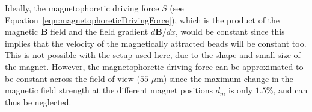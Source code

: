 Ideally, the magnetophoretic driving force $S$ (see Equation~\ref{eqn:magnetophoreticDrivingForce}), which is the product of the magnetic $\mathbf{B}$ field and the field gradient $d\mathbf{B}/dx$, would be constant since this implies that the velocity of the magnetically attracted beads will be constant too. This is not possible with the setup used here, due to the shape and small size of the magnet. However, the magnetophoretic driving force can be approximated to be constant across the field of view ($55$ $\mu$m) since the maximum change in the magnetic field strength at the different magnet positions $d_{m}$ is only $1.5\%$, and can thus be neglected. 

%

